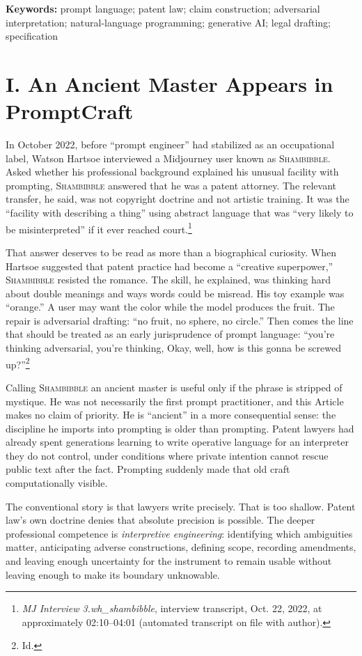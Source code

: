 \documentclass[11pt]{article}
\newcommand{\sham}{\textsc{Shambibble}\xspace}
\begin{document}
\noindent\textbf{Keywords:} prompt language; patent law; claim construction; adversarial interpretation; natural-language programming; generative AI; legal drafting; specification

\section*{I. An Ancient Master Appears in PromptCraft}
In October 2022, before ``prompt engineer'' had stabilized as an occupational label, Watson Hartsoe interviewed a Midjourney user known as \sham. Asked whether his professional background explained his unusual facility with prompting, \sham answered that he was a patent attorney. The relevant transfer, he said, was not copyright doctrine and not artistic training. It was the ``facility with describing a thing'' using abstract language that was ``very likely to be misinterpreted'' if it ever reached court.\footnote{\emph{MJ Interview 3.wh\_shambibble}, interview transcript, Oct. 22, 2022, at approximately 02:10--04:01 (automated transcript on file with author).}

That answer deserves to be read as more than a biographical curiosity. When Hartsoe suggested that patent practice had become a ``creative superpower,'' \sham resisted the romance. The skill, he explained, was thinking hard about double meanings and ways words could be misread. His toy example was ``orange.'' A user may want the color while the model produces the fruit. The repair is adversarial drafting: ``no fruit, no sphere, no circle.'' Then comes the line that should be treated as an early jurisprudence of prompt language: ``you're thinking adversarial, you're thinking, Okay, well, how is this gonna be screwed up?''\footnote{Id.}

Calling \sham an ancient master is useful only if the phrase is stripped of mystique. He was not necessarily the first prompt practitioner, and this Article makes no claim of priority. He is ``ancient'' in a more consequential sense: the discipline he imports into prompting is older than prompting. Patent lawyers had already spent generations learning to write operative language for an interpreter they do not control, under conditions where private intention cannot rescue public text after the fact. Prompting suddenly made that old craft computationally visible.

The conventional story is that lawyers write precisely. That is too shallow. Patent law's own doctrine denies that absolute precision is possible. The deeper professional competence is \emph{interpretive engineering}: identifying which ambiguities matter, anticipating adverse constructions, defining scope, recording amendments, and leaving enough uncertainty for the instrument to remain usable without leaving enough to make its boundary unknowable.
\end{document}

